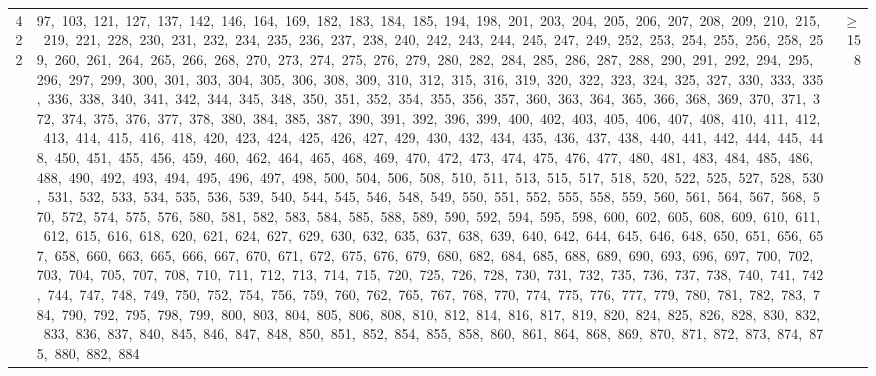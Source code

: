 \begin{longtable}{c|p{}|r}
422 & 97,\ 103,\ 121,\ 127,\ 137,\ 142,\ 146,\ 164,\ 169,\ 182,\ 183,\ 184,\ 185,\ 194,\ 198,\ 201,\ 203,\ 204,\ 205,\ 206,\ 207,\ 208,\ 209,\ 210,\ 215,\ 219,\ 221,\ 228,\ 230,\ 231,\ 232,\ 234,\ 235,\ 236,\ 237,\ 238,\ 240,\ 242,\ 243,\ 244,\ 245,\ 247,\ 249,\ 252,\ 253,\ 254,\ 255,\ 256,\ 258,\ 259,\ 260,\ 261,\ 264,\ 265,\ 266,\ 268,\ 270,\ 273,\ 274,\ 275,\ 276,\ 279,\ 280,\ 282,\ 284,\ 285,\ 286,\ 287,\ 288,\ 290,\ 291,\ 292,\ 294,\ 295,\ 296,\ 297,\ 299,\ 300,\ 301,\ 303,\ 304,\ 305,\ 306,\ 308,\ 309,\ 310,\ 312,\ 315,\ 316,\ 319,\ 320,\ 322,\ 323,\ 324,\ 325,\ 327,\ 330,\ 333,\ 335,\ 336,\ 338,\ 340,\ 341,\ 342,\ 344,\ 345,\ 348,\ 350,\ 351,\ 352,\ 354,\ 355,\ 356,\ 357,\ 360,\ 363,\ 364,\ 365,\ 366,\ 368,\ 369,\ 370,\ 371,\ 372,\ 374,\ 375,\ 376,\ 377,\ 378,\ 380,\ 384,\ 385,\ 387,\ 390,\ 391,\ 392,\ 396,\ 399,\ 400,\ 402,\ 403,\ 405,\ 406,\ 407,\ 408,\ 410,\ 411,\ 412,\ 413,\ 414,\ 415,\ 416,\ 418,\ 420,\ 423,\ 424,\ 425,\ 426,\ 427,\ 429,\ 430,\ 432,\ 434,\ 435,\ 436,\ 437,\ 438,\ 440,\ 441,\ 442,\ 444,\ 445,\ 448,\ 450,\ 451,\ 455,\ 456,\ 459,\ 460,\ 462,\ 464,\ 465,\ 468,\ 469,\ 470,\ 472,\ 473,\ 474,\ 475,\ 476,\ 477,\ 480,\ 481,\ 483,\ 484,\ 485,\ 486,\ 488,\ 490,\ 492,\ 493,\ 494,\ 495,\ 496,\ 497,\ 498,\ 500,\ 504,\ 506,\ 508,\ 510,\ 511,\ 513,\ 515,\ 517,\ 518,\ 520,\ 522,\ 525,\ 527,\ 528,\ 530,\ 531,\ 532,\ 533,\ 534,\ 535,\ 536,\ 539,\ 540,\ 544,\ 545,\ 546,\ 548,\ 549,\ 550,\ 551,\ 552,\ 555,\ 558,\ 559,\ 560,\ 561,\ 564,\ 567,\ 568,\ 570,\ 572,\ 574,\ 575,\ 576,\ 580,\ 581,\ 582,\ 583,\ 584,\ 585,\ 588,\ 589,\ 590,\ 592,\ 594,\ 595,\ 598,\ 600,\ 602,\ 605,\ 608,\ 609,\ 610,\ 611,\ 612,\ 615,\ 616,\ 618,\ 620,\ 621,\ 624,\ 627,\ 629,\ 630,\ 632,\ 635,\ 637,\ 638,\ 639,\ 640,\ 642,\ 644,\ 645,\ 646,\ 648,\ 650,\ 651,\ 656,\ 657,\ 658,\ 660,\ 663,\ 665,\ 666,\ 667,\ 670,\ 671,\ 672,\ 675,\ 676,\ 679,\ 680,\ 682,\ 684,\ 685,\ 688,\ 689,\ 690,\ 693,\ 696,\ 697,\ 700,\ 702,\ 703,\ 704,\ 705,\ 707,\ 708,\ 710,\ 711,\ 712,\ 713,\ 714,\ 715,\ 720,\ 725,\ 726,\ 728,\ 730,\ 731,\ 732,\ 735,\ 736,\ 737,\ 738,\ 740,\ 741,\ 742,\ 744,\ 747,\ 748,\ 749,\ 750,\ 752,\ 754,\ 756,\ 759,\ 760,\ 762,\ 765,\ 767,\ 768,\ 770,\ 774,\ 775,\ 776,\ 777,\ 779,\ 780,\ 781,\ 782,\ 783,\ 784,\ 790,\ 792,\ 795,\ 798,\ 799,\ 800,\ 803,\ 804,\ 805,\ 806,\ 808,\ 810,\ 812,\ 814,\ 816,\ 817,\ 819,\ 820,\ 824,\ 825,\ 826,\ 828,\ 830,\ 832,\ 833,\ 836,\ 837,\ 840,\ 845,\ 846,\ 847,\ 848,\ 850,\ 851,\ 852,\ 854,\ 855,\ 858,\ 860,\ 861,\ 864,\ 868,\ 869,\ 870,\ 871,\ 872,\ 873,\ 874,\ 875,\ 880,\ 882,\ 884 & $\ge$ 158 \\

\end{longtable}
